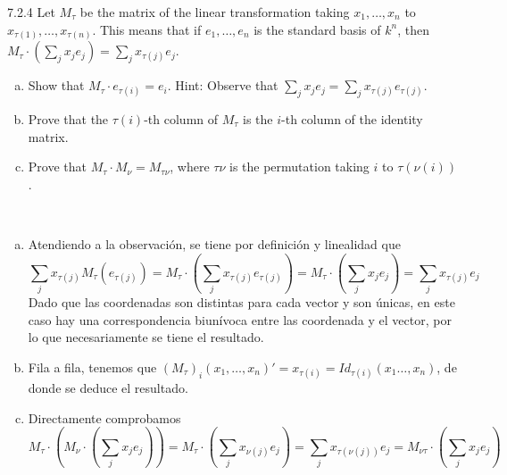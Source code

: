 \documentclass[twoside]{article}
\begin{document}
\begin{ejercicio}{7.2.4}
Let $M_{τ}$ be the matrix of the linear transformation taking $x_1,\dots , x_n$ to $x_{τ(1)},\dots , x_{τ(n)}$.
This means that if $e_1, \dots, e_n$ is the standard basis of $k^n$, then $M_τ \cdot(\sum_j x_je_j) =\sum_j x_{τ(j)}e_j$.
\begin{enumerate}[a.]
\item Show that $M_τ \cdot e_{τ(i)} = e_i$. Hint: Observe that
$\sum_j x_je_j =\sum_j x_{τ(j)}e_{τ(j)}$.
\item Prove that the $τ(i)$-th column of $M_τ$ is the $i$-th column of the identity matrix.
\item Prove that $M_τ \cdot M_ν = M_{τν}$, where $τν$ is the permutation taking $i$ to $τ(ν(i))$.
\end{enumerate}

\end{ejercicio}
\begin{solucion}\
\begin{enumerate}[a.]
\item Atendiendo a la observación, se tiene por definición y linealidad que $$ \sum_j x_{\tau(j)}M_{\tau}(e_{\tau(j)})= M_τ \cdot(\sum_j x_{τ(j)}e_{τ(j)})=M_τ \cdot(
\sum_j x_je_j) =\sum_j x_{τ(j)}e_j$$
Dado que las coordenadas son distintas para cada vector y son únicas, en este caso hay una correspondencia biunívoca entre las coordenada y el vector, por lo que necesariamente se tiene el resultado. 
\item Fila a fila, tenemos que $(M_τ)_i(x_1,\dots, x_n)'=x_{\tau(i)}=Id_{\tau(i)}(x_1\dots, x_n)$, de donde se deduce el resultado.  
\item Directamente comprobamos $$M_τ \cdot( M_ν \cdot(\sum_j x_je_j))=M_τ \cdot(\sum_j x_{\nu(j)}e_j)=\sum_j x_{\tau(\nu(j))}e_j= M_{ντ}\cdot(\sum_j x_je_j)$$
\end{enumerate}
\end{solucion}
\newpage
\end{document}
